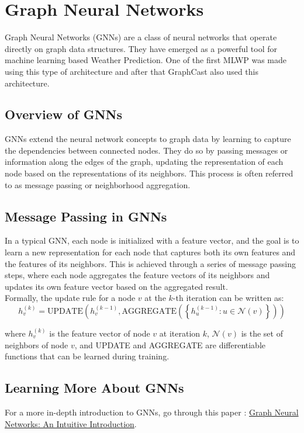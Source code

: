 \section{Graph Neural Networks}

Graph Neural Networks (GNNs) are a class of neural networks that operate directly on graph data structures. They have emerged as a powerful tool for machine learning based Weather Prediction. One of the first MLWP was made using this type of architecture \cite{keisler} and after that GraphCast also used this architecture. 

\subsection{Overview of GNNs}

GNNs extend the neural network concepts to graph data by learning to capture the dependencies between connected nodes. They do so by passing messages or information along the edges of the graph, updating the representation of each node based on the representations of its neighbors. This process is often referred to as message passing or neighborhood aggregation.

\subsection{Message Passing in GNNs}

In a typical GNN, each node is initialized with a feature vector, and the goal is to learn a new representation for each node that captures both its own features and the features of its neighbors. This is achieved through a series of message passing steps, where each node aggregates the feature vectors of its neighbors and updates its own feature vector based on the aggregated result.\\

Formally, the update rule for a node $v$ at the $k$-th iteration can be written as:\\

$$h_v^{(k)} = \text{UPDATE}\left(h_v^{(k-1)}, \text{AGGREGATE}\left(\left\{h_u^{(k-1)}: u \in \mathcal{N}(v)\right\}\right)\right)$$

where $h_v^{(k)}$ is the feature vector of node $v$ at iteration $k$, $\mathcal{N}(v)$ is the set of neighbors of node $v$, and UPDATE and AGGREGATE are differentiable functions that can be learned during training.

\subsection{Learning More About GNNs}

For a more in-depth introduction to GNNs, go through this paper : \href{https://distill.pub/2021/gnn-intro/}{Graph Neural Networks: An Intuitive Introduction}.
